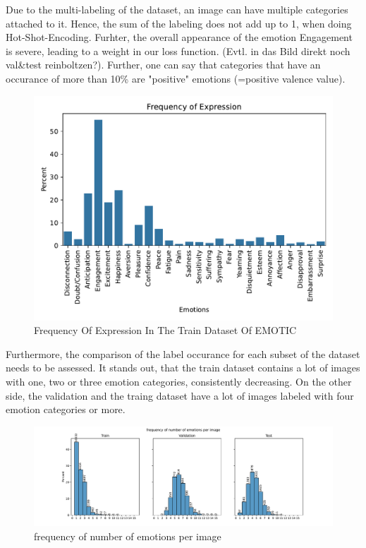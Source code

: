 \documentclass[conference]{IEEEtran}
\begin{document}
Due to the multi-labeling of the dataset, an image can have multiple categories attached to it. Hence, the sum of the labeling does not add up to 1, when doing Hot-Shot-Encoding. Furhter, the overall appearance of the emotion Engagement is severe, leading to a weight in our loss function. (Evtl. in das Bild direkt noch val\&test reinboltzen?). Further, one can say that categories that have an occurance of more than 10\% are  "positive" emotions (=positive valence value).

\begin{figure}[ht]
    \centering
    \includegraphics[width=\columnwidth]{pictures/emotic/frequency_of_expression.pdf}
    \caption{Frequency Of Expression In The Train Dataset Of EMOTIC}
    \label{fig:emotic_frequency_expression}
\end{figure}

Furthermore, the comparison of the label occurance for each subset of the dataset needs to be assessed. It stands out, that the train dataset contains a lot of images with one, two or three emotion categories, consistently decreasing. On the other side, the validation and the traing dataset have a lot of images labeled with four emotion categories or more. 

\begin{figure}[ht]
    \centering
    \includegraphics[width=\columnwidth]{pictures/emotic/frequency_of_expressions.pdf}
    \caption{frequency of number of emotions per image}
    \label{fig:emotic_label_occurance}
\end{figure}
\end{document}
